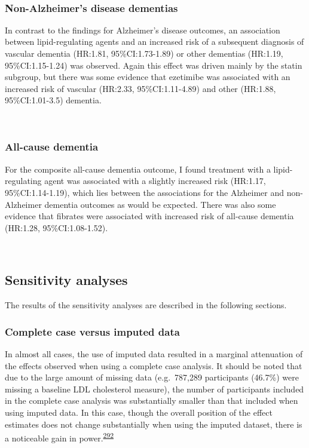 \documentclass[a4paper, twoside]{templates/ociamthesis}
\begin{document}
~

\hypertarget{non-alzheimers-disease-dementias}{%
\subsubsection{Non-Alzheimer's disease dementias}\label{non-alzheimers-disease-dementias}}

In contrast to the findings for Alzheimer's disease outcomes, an association between lipid-regulating agents and an increased risk of a subsequent diagnosis of vascular dementia (HR:1.81, 95\%CI:1.73-1.89) or other dementias (HR:1.19, 95\%CI:1.15-1.24) was observed. Again this effect was driven mainly by the statin subgroup, but there was some evidence that ezetimibe was associated with an increased risk of vascular (HR:2.33, 95\%CI:1.11-4.89) and other (HR:1.88, 95\%CI:1.01-3.5) dementia.

~

\hypertarget{all-cause-dementia}{%
\subsubsection{All-cause dementia}\label{all-cause-dementia}}

For the composite all-cause dementia outcome, I found treatment with a lipid-regulating agent was associated with a slightly increased risk (HR:1.17, 95\%CI:1.14-1.19), which lies between the associations for the Alzheimer and non-Alzheimer dementia outcomes as would be expected. There was also some evidence that fibrates were associated with increased risk of all-cause dementia (HR:1.28, 95\%CI:1.08-1.52).

~

\hypertarget{sensitivity-analyses-1}{%
\subsection{Sensitivity analyses}\label{sensitivity-analyses-1}}

The results of the sensitivity analyses are described in the following sections.

\hypertarget{complete-case-versus-imputed-data}{%
\subsubsection{Complete case versus imputed data}\label{complete-case-versus-imputed-data}}

In almost all cases, the use of imputed data resulted in a marginal attenuation of the effects observed when using a complete case analysis. It should be noted that due to the large amount of missing data (e.g.~787,289 participants (46.7\%) were missing a baseline LDL cholesterol measure), the number of participants included in the complete case analysis was substantially smaller than that included when using imputed data. In this case, though the overall position of the effect estimates does not change substantially when using the imputed dataset, there is a noticeable gain in power.\textsuperscript{\protect\hyperlink{ref-sterne2009}{292}}
\end{document}
